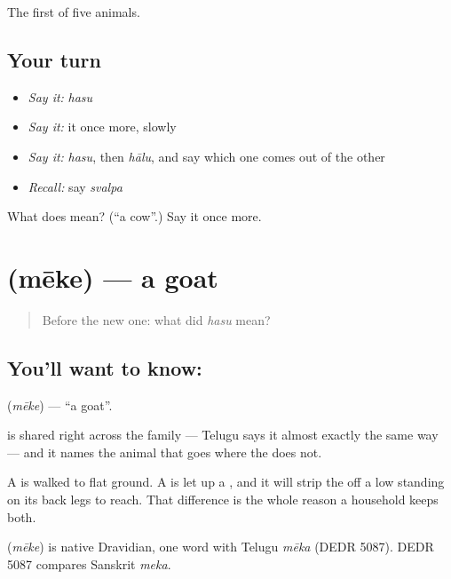 \begin{grammarlens}[title={What you've built}]
The first of five animals.
\end{grammarlens}

\subsection*{Your turn}
\begin{itemize}
\raggedright
  \item \emph{Say it:} \emph{hasu}
  \item \emph{Say it:} it once more, slowly
  \item \emph{Say it:} \emph{hasu}, then \emph{hālu}, and say which one comes out of the other
  \item \emph{Recall:} say \emph{svalpa}
\end{itemize}

\begin{tcolorbox}[breakable,colback=teal!4,colframe=teal!35!black,title={Before you move on}]
What does  mean? (\textquotedblleft{}a cow\textquotedblright{}.) Say it once more.
\end{tcolorbox}
\section[\texorpdfstring{\kn{ಮೇಕೆ} (mēke)}{ಮೇಕೆ (mēke)}]{ (mēke) — a goat}

\label{lesson:KA-C60-goat}



\begin{quote}
Before the new one: what did \emph{hasu} mean?
\end{quote}

\subsection*{You'll want to know: }
\textbf{} (\emph{mēke}) — \textquotedblleft{}a goat\textquotedblright{}.

 is shared right across the family — Telugu says it almost exactly the same way — and it names the animal that goes where the  does not.

A  is walked to flat ground. A  is let up a , and it will strip the  off a low  standing on its back legs to reach. That difference is the whole reason a household keeps both.

\begin{cousinweb}
\textbf{} (\emph{mēke}) is native Dravidian, one word with Telugu \emph{mēka} (DEDR 5087). DEDR 5087 compares Sanskrit \emph{meka}.
\end{cousinweb}

